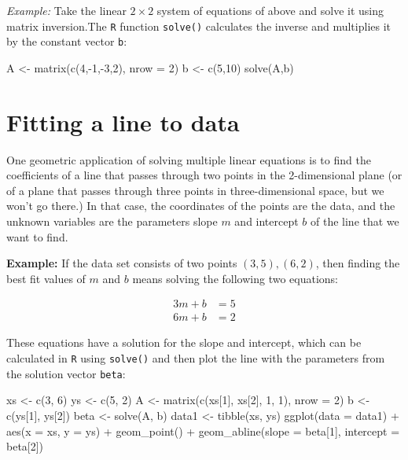 \documentclass[
  letterpaper,
  DIV=11,
  numbers=noendperiod]{scrreprt}
\newenvironment{Shaded}{\begin{snugshade}}{\end{snugshade}}
\newcommand{\NormalTok}[1]{\textcolor[rgb]{0.00,0.23,0.31}{#1}}
\begin{document}
\emph{Example:} Take the linear \(2 \times 2\) system of equations of
above and solve it using matrix inversion.The \texttt{R} function
\texttt{solve()} calculates the inverse and multiplies it by the
constant vector \texttt{b}:

\begin{Shaded}
\begin{Highlighting}[]
\NormalTok{A \textless{}{-} matrix(c(4,{-}1,{-}3,2), nrow = 2)}
\NormalTok{b \textless{}{-} c(5,10)}
\NormalTok{solve(A,b)}
\end{Highlighting}
\end{Shaded}

\section{Fitting a line to data}\label{fitting-a-line-to-data}

One geometric application of solving multiple linear equations is to
find the coefficients of a line that passes through two points in the
2-dimensional plane (or of a plane that passes through three points in
three-dimensional space, but we won't go there.) In that case, the
coordinates of the points are the data, and the unknown variables are
the parameters slope \(m\) and intercept \(b\) of the line that we want
to find.

\textbf{Example:} If the data set consists of two points
\((3,5), (6, 2)\), then finding the best fit values of \(m\) and \(b\)
means solving the following two equations:

\[
\begin{aligned}
 3m + b &= 5 \\
 6m + b &= 2
\end{aligned}
\]

These equations have a solution for the slope and intercept, which can
be calculated in \texttt{R} using \texttt{solve()} and then plot the
line with the parameters from the solution vector \texttt{beta}:

\begin{Shaded}
\begin{Highlighting}[]
\NormalTok{xs \textless{}{-} c(3, 6)}
\NormalTok{ys \textless{}{-} c(5, 2)}
\NormalTok{A \textless{}{-} matrix(c(xs[1], xs[2], 1, 1), nrow = 2)}
\NormalTok{b \textless{}{-} c(ys[1], ys[2])}
\NormalTok{beta \textless{}{-} solve(A, b)}
\NormalTok{data1 \textless{}{-} tibble(xs, ys)}
\NormalTok{ggplot(data = data1) + }
\NormalTok{  aes(x = xs, y = ys) + }
\NormalTok{  geom\_point() + }
\NormalTok{  geom\_abline(slope = beta[1], intercept = beta[2])}
\end{Highlighting}
\end{Shaded}
\end{document}
